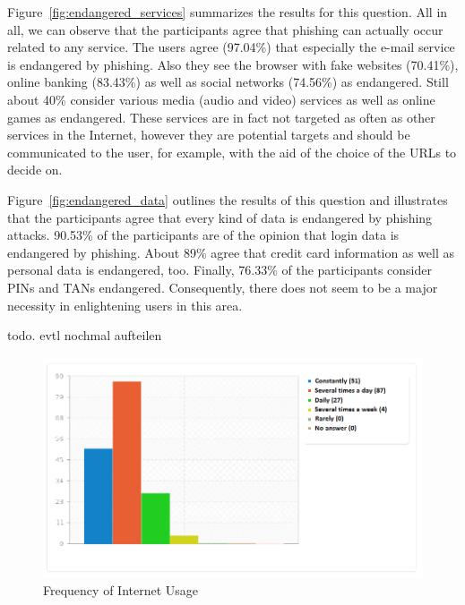 \begin{description}[leftmargin=0cm]
	\item[Services endangered by phishing] Figure~\ref{fig:endangered_services} summarizes the results for this question.
 All in all, we can observe that the participants agree that phishing can actually occur related to any service.
 The users agree (97.04\%) that especially the e-mail service is endangered by phishing.
 Also they see the browser with fake websites (70.41\%), online banking (83.43\%) as well as social networks (74.56\%) as endangered.
 Still about 40\% consider various media (audio and video) services as well as online games as endangered.
 These services are in fact not targeted as often as other services in the Internet, however they are potential targets and should be communicated to the user, for example, with the aid of the choice of the URLs to decide on.

	\item[Data endangered by phishing] Figure~\ref{fig:endangered_data} outlines the results of this question and illustrates that the participants agree that every kind of data is endangered by phishing attacks.
 90.53\% of the participants are of the opinion that login data is endangered by phishing.
 About 89\% agree that credit card information as well as personal data is endangered, too.
 Finally, 76.33\% of the participants consider PINs and TANs endangered.
 Consequently, there does not seem to be a major necessity in enlightening users in this area.

	\item[Preferences for an education app] todo.
 evtl nochmal aufteilen
\end{description}


\begin{figure}[hHtbp]
\includegraphics[width=1.0\textwidth]{graphix/internet_usage.png}%
\caption{Frequency of Internet Usage}%
\label{fig:internet_usage}%
\end{figure}


